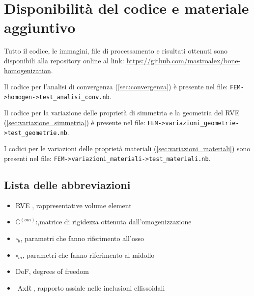 \documentclass[a4paper,num-refs]{oup-contemporary}
\begin{document}
\section{Disponibilità del codice e materiale aggiuntivo}

Tutto il codice, le immagini, file di processamento e risultati ottenuti sono disponibili alla repository online al link: \url{https://github.com/mastroalex/bone-homogenization}. 

Il codice per l'analisi di convergenza (\cref{sec:convergenza}) è presente nel file: \texttt{FEM->homogen->test\_analisi\_conv.nb}.

Il codice per la variazione delle proprietà di simmetria e la geometria del RVE (\cref{sec:variazione_simmetria}) è presente nel file:  \texttt{FEM->variazioni\_geometrie->test\_geometrie.nb}.

I codici per le variazioni delle proprietà materiali (\cref{sec:variazioni_materiali}) sono presenti nel file: \texttt{FEM->variazioni\_materiali->test\_materiali.nb}.


\subsection{Lista delle abbreviazioni}

\begin{itemize}
	\item RVE , rappresentative volume element 
	\item $\mathbb C^{(om)}$:,matrice di rigidezza ottenuta dall'omogenizzazione
	\item $\square_b$, parametri che fanno riferimento all'osso
	\item $\square_m$, parametri che fanno riferimento al midollo
	\item DoF, degrees of freedom
	\item $\operatorname{AxR}$, rapporto assiale nelle inclusioni ellissoidali
\end{itemize}
 



\newpage

\end{document}
